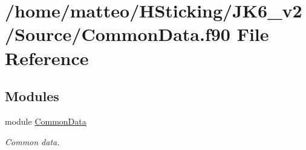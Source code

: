 \hypertarget{_common_data_8f90}{
\section{/home/matteo/HSticking/JK6\_\-v2/Source/CommonData.f90 File Reference}
\label{_common_data_8f90}
}
\subsection*{Modules}
\begin{DoxyCompactItemize}
\item 
module \hyperlink{namespace_common_data}{CommonData}


\begin{DoxyCompactList}\small\item\em Common data. \item\end{DoxyCompactList}\end{DoxyCompactItemize}
